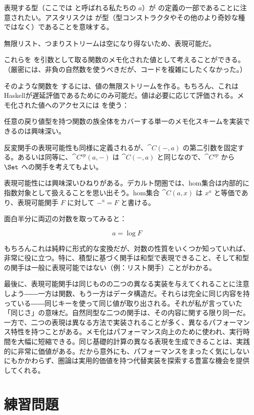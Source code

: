 表現する型（ここでは  と呼ばれる私たちの $a$）が  の定義の一部であることに注意されたい。アスタリスクは  が型（型コンストラクタやその他のより奇妙な種ではなく）であることを意味する。

無限リスト、つまりストリームは空になり得ないため、表現可能だ。

これらを  を引数として取る関数のメモ化された値として考えることができる。（厳密には、非負の自然数を使うべきだが、コードを複雑にしたくなかった。）

そのような関数を  するには、値の無限ストリームを作る。もちろん、これはHaskellが遅延評価であるためにのみ可能だ。値は必要に応じて評価される。メモ化された値へのアクセスには  を使う：

任意の戻り値型を持つ関数の族全体をカバーする単一のメモ化スキームを実装できるのは興味深い。

反変関手の表現可能性も同様に定義されるが、$\cat{C}(-, a)$ の第二引数を固定する。あるいは同等に、$\cat{C}^\mathit{op}(a, -)$ は $\cat{C}(-, a)$ と同じなので、$\cat{C}^\mathit{op}$ から $\Set$ への関手を考えてもよい。

表現可能性には興味深いひねりがある。デカルト閉圏では、hom集合は内部的に指数対象として扱えることを思い出そう。hom集合 $\cat{C}(a, x)$ は $x^a$ と等価であり、表現可能関手 $F$ に対して $-^a = F$ と書ける。

面白半分に両辺の対数を取ってみると：

\[a = \log F\]

もちろんこれは純粋に形式的な変換だが、対数の性質をいくつか知っていれば、非常に役に立つ。特に、積型に基づく関手は和型で表現できること、そして和型の関手は一般に表現可能ではない（例：リスト関手）ことがわかる。

最後に、表現可能関手は同じものの二つの異なる実装を与えてくれることに注意しよう――一方は関数、もう一方はデータ構造だ。それらは完全に同じ内容を持っている――同じキーを使って同じ値が取り出される。それが私が言っていた「同じさ」の意味だ。自然同型な二つの関手は、その内容に関する限り同一だ。一方で、二つの表現は異なる方法で実装されることが多く、異なるパフォーマンス特性を持つことがある。メモ化はパフォーマンス向上のために使われ、実行時間を大幅に短縮できる。同じ基礎的計算の異なる表現を生成できることは、実践的に非常に価値がある。だから意外にも、パフォーマンスをまったく気にしないにもかかわらず、圏論は実用的価値を持つ代替実装を探索する豊富な機会を提供してくれる。

\section{練習問題}

